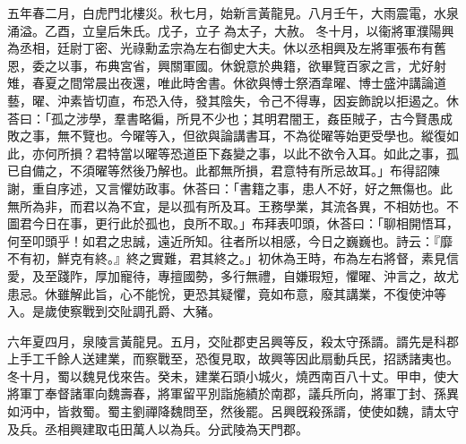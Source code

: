 \begin{pinyinscope}
 
五年春二月，白虎門北樓災。秋七月，始新言黃龍見。八月壬午，大雨震電，水泉涌溢。乙酉，立皇后朱氏。戊子，立子𩅦為太子，大赦。
 冬十月，以衞將軍濮陽興為丞相，廷尉丁密、光祿勳孟宗為左右御史大夫。休以丞相興及左將軍張布有舊恩，委之以事，布典宮省，興關軍國。休銳意於典籍，欲畢覽百家之言，尤好射雉，春夏之間常晨出夜還，唯此時舍書。休欲與愽士祭酒韋曜、博士盛沖講論道藝，曜、沖素皆切直，布恐入侍，發其陰失，令己不得專，因妄飾說以拒遏之。休荅曰：「孤之涉學，羣書略徧，所見不少也；其明君闇王，姦臣賊子，古今賢愚成敗之事，無不覽也。今曜等入，但欲與論講書耳，不為從曜等始更受學也。縱復如此，亦何所損？君特當以曜等恐道臣下姦變之事，以此不欲令入耳。如此之事，孤已自備之，不須曜等然後乃解也。此都無所損，君意特有所忌故耳。」布得詔陳謝，重自序述，又言懼妨政事。休荅曰：「書籍之事，患人不好，好之無傷也。此無所為非，而君以為不宜，是以孤有所及耳。王務學業，其流各異，不相妨也。不圖君今日在事，更行此於孤也，良所不取。」布拜表叩頭，休荅曰：「聊相開悟耳，何至叩頭乎！如君之忠誠，遠近所知。往者所以相感，今日之巍巍也。詩云：『靡不有初，鮮克有終。』終之實難，君其終之。」初休為王時，布為左右將督，素見信愛，及至踐阼，厚加寵待，專擅國勢，多行無禮，自嫌瑕短，懼曜、沖言之，故尤患忌。休雖解此旨，心不能恱，更恐其疑懼，竟如布意，廢其講業，不復使沖等入。是歲使察戰到交阯調孔爵、大豬。
 
 
六年夏四月，泉陵言黃龍見。五月，交阯郡吏呂興等反，殺太守孫諝。諝先是科郡上手工千餘人送建業，而察戰至，恐復見取，故興等因此扇動兵民，招誘諸夷也。冬十月，蜀以魏見伐來告。癸未，建業石頭小城火，燒西南百八十丈。甲申，使大將軍丁奉督諸軍向魏壽春，將軍留平別詣施績於南郡，議兵所向，將軍丁封、孫異如沔中，皆救蜀。蜀主劉禪降魏問至，然後罷。呂興旣殺孫諝，使使如魏，請太守及兵。丞相興建取屯田萬人以為兵。分武陵為天門郡。
 

\end{pinyinscope}
